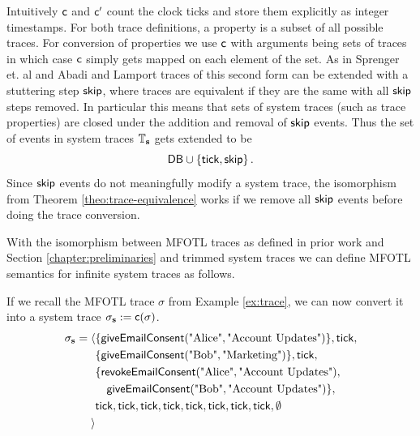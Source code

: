 Intuitively $\mathsf{c}$ and $\mathsf{c}'$ count the clock ticks and store them
explicitly as integer timestamps.
For both trace definitions, a property is a subset of all possible traces.
For conversion of properties we use $\mathsf{c}$ with arguments being sets of
traces in which case $\mathsf{c}$ simply gets mapped on each element of the set.
As in Sprenger et. al \cite{igloo} and Abadi and Lamport \cite{refinement-mappings}
traces of this second form can be extended with a stuttering step
$\mathsf{skip}$, where traces are equivalent if they are the same with all
$\mathsf{skip}$ steps removed.
In particular this means that sets of system traces (such as trace properties)
are closed under the addition and removal of $\mathsf{skip}$ events.
Thus the set of events in system traces $\mathbb{T}_{\mathbf{s}}$
gets extended to be
$$
    \mathsf{DB} \cup \left\{ \mathsf{tick}, \mathsf{skip} \right\}.
$$
Since $\mathsf{skip}$ events do not meaningfully modify a system trace,
the isomorphism from Theorem \ref{theo:trace-equivalence} works if
we remove all $\mathsf{skip}$ events before doing the trace conversion.

With the isomorphism between MFOTL traces as defined in prior work and
Section \ref{chapter:preliminaries} and trimmed system traces we can
define MFOTL semantics for infinite system traces as follows.

\begin{example}
    \label{ex:system-trace}
    If we recall the MFOTL trace $\sigma$ from
    Example \ref{ex:trace}, we can now convert it into
    a system trace $\sigma_{\mathbf{s}} := \mathsf{c}(\sigma)$.
    \begin{align*}
        \sigma_{\mathbf{s}} = \langle
             & \{\mathsf{giveEmailConsent}(\text{"Alice"}, \text{"Account Updates"})\},
             \mathsf{tick}, \\ 
             & \{\mathsf{giveEmailConsent}(\text{"Bob"}, \text{"Marketing"})\},
             \mathsf{tick}, \\
             &  \{\mathsf{revokeEmailConsent}(\text{"Alice"}, \text{"Account Updates"}), \\
             &\quad \mathsf{giveEmailConsent}(\text{"Bob"}, \text{"Account Updates"})\}, \\
             & \mathsf{tick}, \mathsf{tick}, \mathsf{tick}, \mathsf{tick}, \mathsf{tick}, \mathsf{tick}, \mathsf{tick}, \mathsf{tick}, \emptyset \\
        \rangle \\
    \end{align*}
\end{example}

